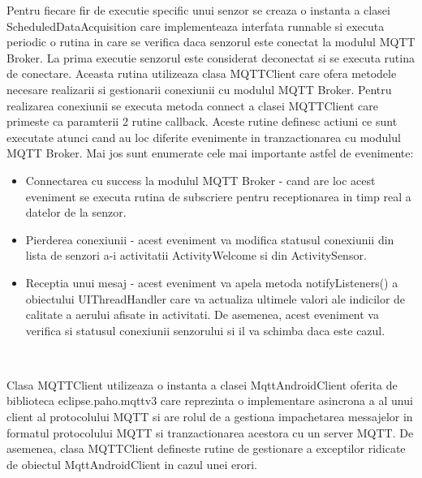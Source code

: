 Pentru fiecare fir de executie specific unui senzor se creaza o instanta a clasei ScheduledDataAcquisition care implementeaza interfata runnable si executa periodic o rutina 
in care se verifica daca senzorul este conectat la modulul MQTT Broker. La prima executie senzorul este considerat deconectat si se executa rutina de conectare. 
Aceasta rutina utilizeaza clasa MQTTClient care ofera metodele necesare realizarii si gestionarii conexiunii cu modulul MQTT Broker. Pentru realizarea conexiunii se 
executa metoda connect a clasei MQTTClient care primeste ca paramterii 2 rutine callback. Aceste rutine definesc actiuni ce sunt executate atunci cand au loc 
diferite evenimente in tranzactionarea cu modulul MQTT Broker. Mai jos sunt enumerate cele mai importante astfel de evenimente:
\begin{itemize}
	\item Connectarea cu success la modulul MQTT Broker - cand are loc acest eveniment se executa rutina de subscriere pentru receptionarea in timp real a datelor de la 
	senzor.
	\item Pierderea conexiunii - acest eveniment va modifica statusul conexiunii din lista de senzori a-i activitatii ActivityWelcome si din ActivitySensor.
	\item Receptia unui mesaj - acest eveniment va apela metoda notifyListeners() a obiectului UIThreadHandler care va actualiza ultimele valori ale indicilor de 
    calitate a aerului afisate in activitati. De asemenea, acest eveniment va verifica si statusul conexiunii senzorului si il va schimba 
	daca este cazul.
\end{itemize}

\

Clasa MQTTClient utilizeaza o instanta a clasei MqttAndroidClient oferita de biblioteca eclipse.paho.mqttv3 care reprezinta o implementare asincrona a 
al unui client al protocolului MQTT si are rolul de a gestiona impachetarea messajelor in formatul protocolului MQTT si tranzactionarea acestora cu un server MQTT. De asemenea, 
clasa MQTTClient defineste rutine de gestionare a exceptilor ridicate de obiectul MqttAndroidClient in cazul unei erori. 

